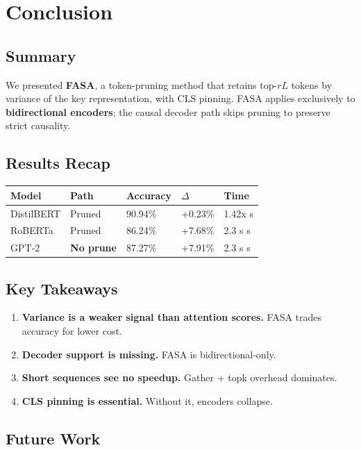 
\section{Conclusion}

\subsection{Summary}

We presented \textbf{FASA}, a token-pruning method that retains top-$rL$ tokens 
by variance of the key representation, with CLS pinning. FASA applies 
exclusively to \textbf{bidirectional encoders}; the causal decoder path skips 
pruning to preserve strict causality.

\subsection{Results Recap}

\begin{table}[H]
\centering
\small
\begin{tabular}{lllll}
\toprule
\textbf{Model} & \textbf{Path} & \textbf{Accuracy} & \textbf{$\Delta$} & \textbf{Time} \\
\midrule
DistilBERT & Pruned & 90.94\% & +0.23\% & 1.42x s \\
RoBERTa & Pruned & 86.24\% & +7.68\% & 2.3 s s \\
GPT-2 & \textbf{No prune} & 87.27\% & +7.91\% & 2.3 s s \\
\bottomrule
\end{tabular}
\end{table}

\subsection{Key Takeaways}

\begin{enumerate}
\item \textbf{Variance is a weaker signal than attention scores.} FASA trades
  accuracy for lower cost.
\item \textbf{Decoder support is missing.} FASA is bidirectional-only.
\item \textbf{Short sequences see no speedup.} Gather + topk overhead dominates.
\item \textbf{CLS pinning is essential.} Without it, encoders collapse.

\end{enumerate}
\subsection{Future Work}

